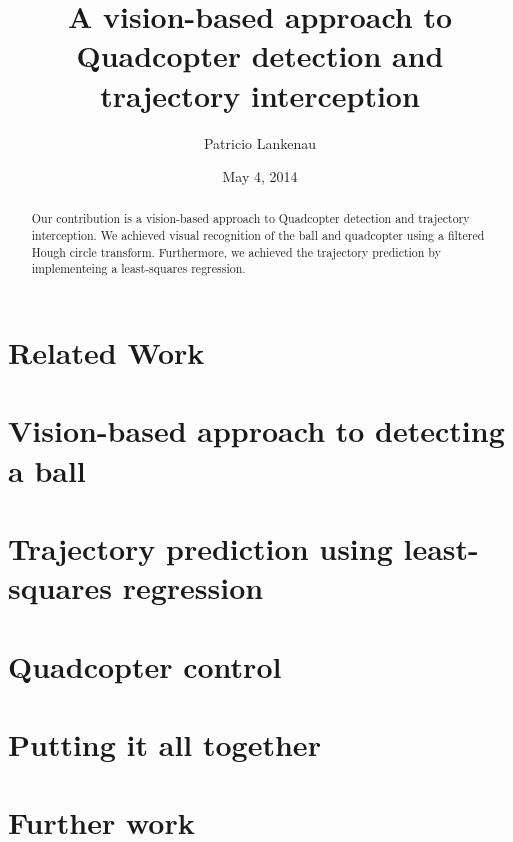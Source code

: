 \documentclass{article}
\title{A vision-based approach to Quadcopter detection and trajectory interception}
\author{Patricio Lankenau}
\date{May 4, 2014}
\begin{document}
\maketitle

\begin{abstract}
Our contribution is a vision-based approach to Quadcopter detection and trajectory interception.
We achieved visual recognition of the ball and quadcopter using a filtered Hough circle transform.
Furthermore, we achieved the trajectory prediction by implementeing a least-squares regression.
\end{abstract}

\section{Related Work}

\section{Vision-based approach to detecting a ball}

\section{Trajectory prediction using least-squares regression}

\section{Quadcopter control}

\section{Putting it all together}

\section{Further work}
\end{document}
